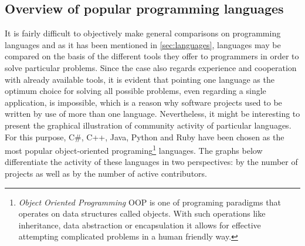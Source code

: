 \subsection{Overview of popular programming languages}\label{subsec:lang_compare}
It is fairly difficult to objectively make general comparisons on programming languages and as it has been mentioned in \ref{sec:languages}, languages may be compared on the basis of the different tools they offer to programmers in order to solve particular problems. Since the case also regards experience and cooperation with already available tools, it is evident that pointing one language as the optimum choice for solving all possible problems, even regarding a single application, is impossible, which is a reason why software projects used to be written by use of more than one language. Nevertheless, it might be interesting to present the graphical illustration of community activity of particular languages. For this purpose, C\#, C++, Java, Python and Ruby have been chosen as the most popular object-oriented programing\footnote{\textit{Object Oriented Programming} OOP is one of programing paradigms that operates on data structures called objects. With such operations like inheritance, data abstraction or encapsulation it allows for effective attempting complicated problems in a human friendly way.} languages. The graphs below differentiate the activity of these languages in two perspectives: by the number of projects as well as by the number of active contributors.
